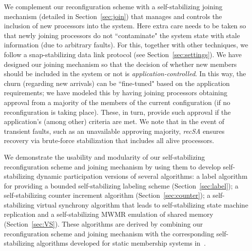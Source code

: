 \documentclass[11pt]{article}
\begin{document}
 We complement our reconfiguration scheme with a self-stabilizing joining mechanism (detailed in Section~\ref{sec:join}) that manages and controls the inclusion of new processors into the system. Here extra care needs to be taken so that newly joining processors do not ``contaminate" the system state with stale information (due to arbitrary faults). For this, together with other techniques, we follow a snap-stabilizing data link protocol (see Section~\ref{sec:settings}). We have designed our joining mechanism so that the decision of whether new members should be included in the system or not is {\em application-controlled}. In this way, the churn (regarding new arrivals) can be ``fine-tuned" based on the application requirements; we have modeled this
by having joining processors obtaining approval from a majority of the members of the current configuration (if no reconfiguration is taking place). These, in turn, provide such approval if the application's (among other) criteria are met. 
We note that in the event of transient faults, such as an unavailable approving majority, {\em recSA} ensures recovery via brute-force stabilization that includes all alive processors.\vspace{.3em}

 We demonstrate the usability and modularity of our self-stabilizing reconfiguration scheme and joining mechanism by using them to develop self-stabilizing dynamic participation versions of several algorithms: a label
algorithm for providing a bounded self-stabilizing labeling scheme (Section~\ref{sec:label}); a self-stabilizing counter increment algorithm (Section~\ref{sec:counter}); a self-stabilizing virtual synchrony algorithm that leads to self-stabilizing state machine replication and a self-stabilizing MWMR emulation of shared memory (Section~\ref{sec:VS}). 
These algorithms are derived by combining our reconfiguration scheme and joining mechanism with the corresponding self-stabilizing algorithms developed for static membership systems in~\cite{SSVS}.
\end{document}
